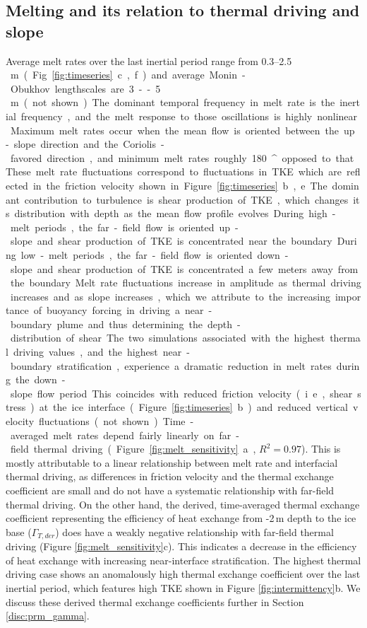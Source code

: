\documentclass[tc, manuscript]{copernicus}
\begin{document}
\subsection{Melting and its relation to thermal driving and slope}
Average melt rates over the last inertial period range from 0.3--2.5\unit\,{m} (Fig. \ref{fig:timeseries}c,f) and average Monin-Obukhov lengthscales are 3--5\,\unit{m} (not shown). The dominant temporal frequency in melt rate is the inertial frequency, and the melt response to those oscillations is highly nonlinear. Maximum melt rates occur when the mean flow is oriented between the up-slope direction and the Coriolis-favored direction, and minimum melt rates roughly 180\unit{^{\circ}} opposed to that. These melt rate fluctuations correspond to fluctuations in TKE which are reflected in the friction velocity shown in Figure \ref{fig:timeseries}b,e. The dominant contribution to turbulence is shear production of TKE, which changes its distribution with depth as the mean flow profile evolves. During high-melt periods, the far-field flow is oriented up-slope and shear production of TKE is concentrated near the boundary. During low-melt periods, the far-field flow is oriented down-slope and shear production of TKE is concentrated a few meters away from the boundary. Melt rate fluctuations increase in amplitude as thermal driving increases and as slope increases, which we attribute to the increasing importance of buoyancy forcing in driving a near-boundary plume and thus determining the depth-distribution of shear. The two simulations associated with the highest thermal driving values, and the highest near-boundary stratification, experience a dramatic reduction in melt rates during the down-slope flow period. This coincides with reduced friction velocity (i.e., shear stress) at the ice interface (Figure \ref{fig:timeseries}b) and reduced vertical velocity fluctuations (not shown). 

Time-averaged melt rates depend fairly linearly on far-field thermal driving (Figure \ref{fig:melt_sensitivity}a, $R^2=0.97$). This is mostly attributable to a linear relationship between melt rate and interfacial thermal driving, as differences in friction velocity and the thermal exchange coefficient are small and do not have a systematic relationship with far-field thermal driving. On the other hand, the derived, time-averaged thermal exchange coefficient representing the efficiency of heat exchange from -2\,\unit{m} depth to the ice base ($\Gamma_{T,der}$) does have a weakly negative relationship with far-field thermal driving (Figure \ref{fig:melt_sensitivity}c). This indicates a decrease in the efficiency of heat exchange with increasing near-interface stratification. The highest thermal driving case shows an anomalously high thermal exchange coefficient over the last inertial period, which features high TKE shown in Figure \ref{fig:intermittency}b. We discuss these derived thermal exchange coefficients further in Section \ref{disc:prm_gamma}.
\end{document}

